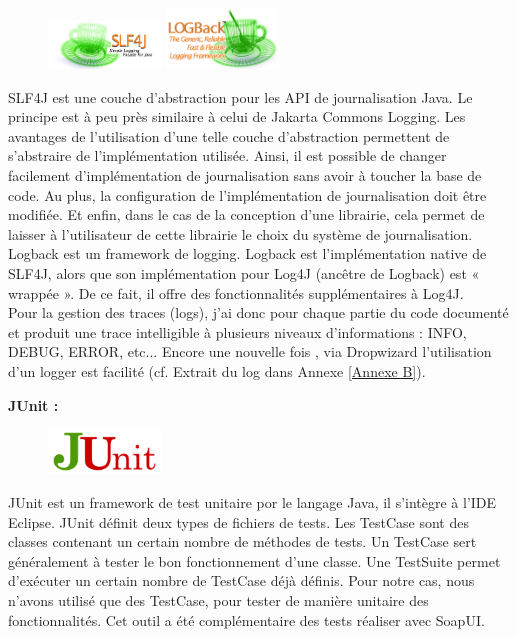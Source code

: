 \begin{itemize}
\begin{figure}
\centering
\includegraphics[width=3cm]{images/slf4j-logo.jpg}
\includegraphics[width=3cm]{images/lblogo.jpg}
\end{figure}
\noindent SLF4J est une couche d'abstraction pour les API de journalisation Java. Le principe est à peu près similaire à celui de Jakarta Commons Logging. Les avantages de l'utilisation d'une telle couche d'abstraction permettent de s'abstraire de l'implémentation utilisée. Ainsi, il est possible de changer facilement d'implémentation de journalisation sans avoir à toucher la base de code. Au plus, la configuration de l'implémentation de journalisation doit être modifiée. Et enfin, dans le cas de la conception d'une librairie, cela permet de laisser à l'utilisateur de cette librairie le choix du système de journalisation.\\
Logback est un framework de logging. Logback est l'implémentation native de SLF4J, alors que son implémentation pour Log4J (ancêtre de Logback) est « wrappée ». De ce fait, il offre des fonctionnalités supplémentaires à Log4J.\\
Pour la gestion des traces (logs), j'ai donc pour chaque partie du code documenté et produit une trace intelligible à plusieurs niveaux d'informations : INFO, DEBUG, ERROR, etc... Encore une nouvelle fois , via Dropwizard l'utilisation d'un logger est facilité (cf. Extrait du log dans Annexe \ref{Annexe B}).

\textbf{JUnit :} 

\begin{figure}
\centering
\includegraphics[width=3cm]{images/junit-logo.png}
\end{figure}
\noindent JUnit est un framework de test unitaire por le langage Java, il s'intègre à l'IDE Eclipse. JUnit définit deux types de fichiers de tests. Les TestCase sont des classes contenant un certain nombre de méthodes de tests. Un TestCase sert généralement à tester le bon fonctionnement d'une classe. Une TestSuite permet d'exécuter un certain nombre de TestCase déjà définis. Pour notre cas, nous n'avons utilisé que des TestCase, pour tester de manière unitaire des fonctionnalités. Cet outil a été complémentaire des tests réaliser avec SoapUI.



\end{itemize}
